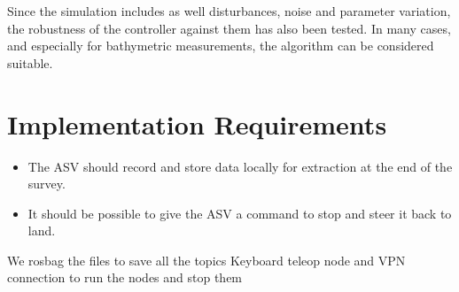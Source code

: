 Since the simulation includes as well disturbances, noise and parameter variation, the robustness of the controller against them has also been tested. In many cases, and especially for bathymetric measurements, the algorithm can be considered suitable.


\section{Implementation Requirements}
\begin{itemize}
    \item The ASV should record and store data locally for extraction at the end of the survey.
    \item It should be possible to give the ASV a command to stop and steer it back to land.
\end{itemize}

We rosbag the files to save all the topics
Keyboard teleop node and VPN connection to run the nodes and stop them